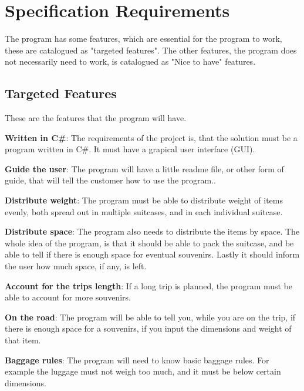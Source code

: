 

\section{Specification Requirements}
\label{sec:Spec}
The program has some features, which are essential for the program to work, these are catalogued as "targeted features". The other features, the program does not necessarily need to work, is catalogued as "Nice to have" features.
\newline

\subsection{Targeted Features}
These are the features that the program will have. 


\textbf{Written in C\#}:
The requirements of the project is, that the solution must be a program written in C\#. It must have a grapical user interface (GUI).

\textbf{Guide the user}:
The program will have a little readme file, or other form of guide, that will tell the customer how to use the program..
\newline

\textbf{Distribute weight}:
The program must be able to distribute weight of items evenly, both spread out in multiple suitcases, and in each individual suitcase.
\newline

\textbf{Distribute space}:
The program also needs to distribute the items by space. The whole idea of the program, is that it should be able to pack the suitcase, and be able to tell if there is enough space for eventual souvenirs. Lastly it should inform the user how much space, if any, is left.
\newline

\textbf{Account for the trips length}:
If a long trip is planned, the program must be able to account for more souvenirs.
\newline

\textbf{On the road}:
The program will be able to tell you, while you are on the trip, if there is enough space for a souvenirs, if you input the dimensions and weight of that item. 
\newline

\textbf{Baggage rules}:
The program will need to know basic baggage rules. For example the luggage must not weigh too much, and it must be below certain dimensions. 
\newline


